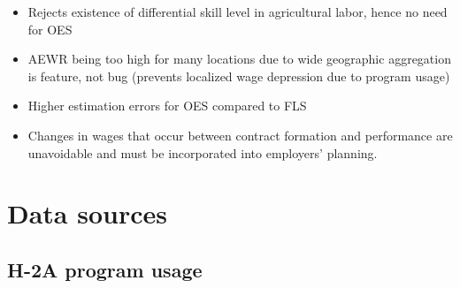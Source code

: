 \documentclass[14pt]{article}
\begin{document}
\begin{itemize}
\begin{itemize}
\begin{itemize}
			            \item Rejects existence of differential skill level in agricultural labor, hence no need for OES
			            \item AEWR being too high for many locations due to wide geographic aggregation is feature, not bug (prevents localized wage depression due to program usage)
			            \item Higher estimation errors for OES compared to FLS
			            \item Changes in wages that occur between contract formation and performance are unavoidable and must be incorporated into employers' planning.
		            \end{itemize}
	      \end{itemize}
	\end{itemize}



\section{Data sources}

\subsection{H-2A program usage}
\end{document}
